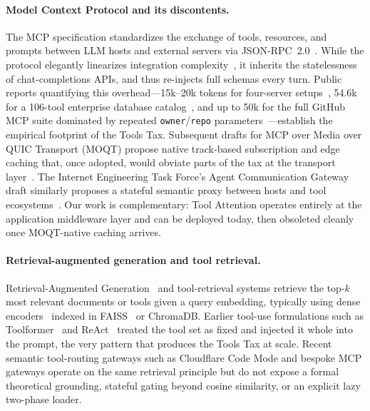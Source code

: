 \documentclass[11pt]{article}
\begin{document}
\paragraph{Model Context Protocol and its discontents.} The MCP specification standardizes the exchange of tools, resources, and prompts between LLM hosts and external servers via JSON-RPC~2.0~\citep{mcp2025spec}. While the protocol elegantly linearizes integration complexity~\citep{anthropic2024mcp}, it inherits the statelessness of chat-completions APIs, and thus re-injects full schemas every turn. Public reports quantifying this overhead---15k--20k tokens for four-server setups~\citep{pan2026agent}, 54.6k for a 106-tool enterprise database catalog~\citep{kloski2026mcp,saha2026agentic}, and up to 50k for the full GitHub MCP suite dominated by repeated \texttt{owner}/\texttt{repo} parameters~\citep{kloski2026mcp}---establish the empirical footprint of the Tools Tax. Subsequent drafts for MCP over Media over QUIC Transport (MOQT) propose native track-based subscription and edge caching that, once adopted, would obviate parts of the tax at the transport layer~\citep{jennings2025moqt,jennings2025aimcp}. The Internet Engineering Task Force's Agent Communication Gateway draft similarly proposes a stateful semantic proxy between hosts and tool ecosystems~\citep{ietf2026agentgw}. Our work is complementary: Tool Attention operates entirely at the application middleware layer and can be deployed today, then obsoleted cleanly once MOQT-native caching arrives.

\paragraph{Retrieval-augmented generation and tool retrieval.} Retrieval-Augmented Generation~\citep{lewis2020rag} and tool-retrieval systems retrieve the top-$k$ most relevant documents or tools given a query embedding, typically using dense encoders~\citep{reimers2019sbert} indexed in FAISS~\citep{johnson2019faiss} or ChromaDB. Earlier tool-use formulations such as Toolformer~\citep{schick2023toolformer} and ReAct~\citep{yao2023react} treated the tool set as fixed and injected it whole into the prompt, the very pattern that produces the Tools Tax at scale. Recent semantic tool-routing gateways such as Cloudflare Code Mode and bespoke MCP gateways operate on the same retrieval principle but do not expose a formal theoretical grounding, stateful gating beyond cosine similarity, or an explicit lazy two-phase loader.
\end{document}
